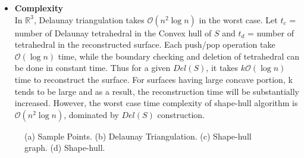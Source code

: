 \documentclass[preprint,5p,times,twocolumn]{elsarticle}
\begin{document}
\begin{itemize}
    \item \textbf{Complexity}\\
    In $\mathbb{R}^3$, Delaunay triangulation takes $\mathcal{O}(n^2\log{}n)$ in the worst case\cite{Boissonnat:1984:GST:357346.357349}. Let $t_c$ = number of Delaunay tetrahedral in the Convex hull of $S$ and $t_d$ = number of tetrahedral in the reconstructed surface. Each push/pop operation take $\mathcal{O}(\log{}n)$ time, while the boundary  checking and deletion of tetrahedral can be done in constant time. Thus for a given $Del(S)$, it takes $k\mathcal{O}(\log{}n)$ time to reconstruct the surface. For surfaces having large concave portion, k tends to be large and as a result, the reconstruction time will be substantially increased. However, the worst case time complexity of shape-hull algorithm is $\mathcal{O}(n^2\log{}n)$, dominated by $Del(S)$ construction.
\end{itemize}
\begin{figure}[!h]
	\centering
	\caption{
		(a) Sample Points. (b) Delaunay Triangulation. (c) Shape-hull graph. (d) Shape-hull.
	}
\end{figure}
\end{document}
